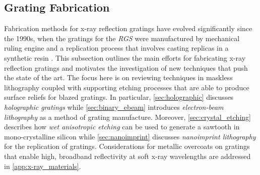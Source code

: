 \subsection{Grating Fabrication}\label{sec:grating_fab_intro}
Fabrication methods for x-ray reflection gratings have evolved significantly since the 1990s, when the gratings for the \emph{RGS} were manufactured by mechanical ruling engine and a replication process that involves casting replicas in a synthetic resin \cite{Kahn96,denHerder01}. 
This subsection outlines the main efforts for fabricating x-ray reflection gratings and motivates the investigation of new techniques that push the state of the art. 
The focus here is on reviewing techniques in maskless lithography coupled with supporting etching processes that are able to produce surface reliefs for blazed gratings. %
In particular, \cref{sec:holographic} discusses \emph{holographic gratings} while \cref{sec:binary_ebeam} introduces \emph{electron-beam lithography} as a method of grating manufacture.  
Moreover, \cref{sec:crystal_etching} describes how \emph{wet anisotropic etching} can be used to generate a sawtooth in mono-crystalline silicon while \cref{sec:nanoimprint} discusses \emph{nanoimprint lithography} for the replication of gratings. 
Considerations for metallic overcoats on gratings that enable high, broadband reflectivity at soft x-ray wavelengths are addressed in \cref{app:x-ray_materials}. 

